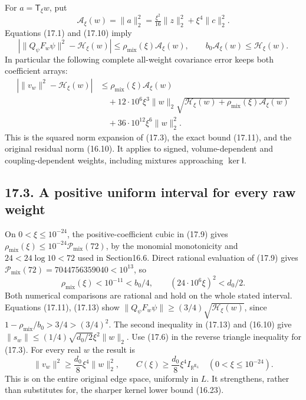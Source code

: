 \documentclass[
]{article}
\begin{document}
For \(a=\mathsf T_\xi w\), put \[
\mathcal A_\xi(w)=\|a\|_2^2
 =\tfrac{\xi^2}{16}\|z\|_2^2+\xi^4\|c\|_2^2 .
\] Equations (17.1) and (17.10) imply \[
\left|\|Q_\psi F_w\psi\|^2-\mathcal H_\xi(w)\right|
\le\rho_{\mathrm{mix}}(\xi)\mathcal A_\xi(w),\qquad
b_0\mathcal A_\xi(w)\le\mathcal H_\xi(w).                    \tag{17.11}
\] In particular the following complete all-weight covariance error
keeps both coefficient arrays: \[
\begin{split}
\left|\|v_w\|^2-\mathcal H_\xi(w)\right|
&\le \rho_{\mathrm{mix}}(\xi)\mathcal A_\xi(w)\\
&\quad+12\cdot10^6\xi^3\|w\|_2
 \sqrt{\mathcal H_\xi(w)+\rho_{\mathrm{mix}}(\xi)\mathcal A_\xi(w)}\\
&\quad+36\cdot10^{12}\xi^6\|w\|_2^2 .
\end{split}                                                   \tag{17.12}
\] This is the squared norm expansion of (17.3), the exact bound
(17.11), and the original residual norm (16.10). It applies to signed,
volume-dependent and coupling-dependent weights, including mixtures
approaching \(\ker\mathsf I\).

\subsection{17.3. A positive uniform interval for every raw
weight}\label{a-positive-uniform-interval-for-every-raw-weight}

On \(0<\xi\le10^{-24}\), the positive-coefficient cubic in (17.9) gives
\(\rho_{\mathrm{mix}}(\xi)\le10^{-24}\mathcal P_{\mathrm{mix}}(72)\), by
the monomial monotonicity and \(24<24\log10<72\) used in Section16.6.
Direct rational evaluation of (17.9) gives
\(\mathcal P_{\mathrm{mix}}(72)=7044756359040<10^{13}\), so \[
\rho_{\mathrm{mix}}(\xi)<10^{-11}<b_0/4,\qquad
(24\cdot10^6\xi)^2<d_0/2 .                                 \tag{17.13}
\] Both numerical comparisons are rational and hold on the whole stated
interval. Equations (17.11), (17.13) show
\(\|Q_\psi F_w\psi\|\ge(3/4)\sqrt{\mathcal H_\xi(w)}\), since
\(1-\rho_{\mathrm{mix}}/b_0>3/4>(3/4)^2\). The second inequality in
(17.13) and (16.10) give \(\|s_w\|\le(1/4)\sqrt{d_0/2}\xi^2\|w\|_2\).
Use (17.6) in the reverse triangle inequality for (17.3). For every real
\(w\) the result is \[
\boxed{\quad
\|v_w\|^2\ge\frac{d_0}{8}\xi^4\|w\|_2^2,\qquad
C(\xi)\ge\frac{d_0}{8}\xi^4 I_{\mathbb R^{\mathsf E_L}}
\quad(0<\xi\le10^{-24}).\quad}                               \tag{17.14}
\] This is on the entire original edge space, uniformly in \(L\). It
strengthens, rather than substitutes for, the sharper kernel lower bound
(16.23).
\end{document}
